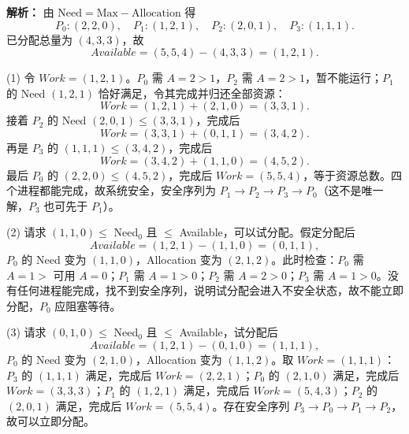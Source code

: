 \begin{enumerate}[resume]
\ifshowsolutions\par\noindent\textbf{解析：} 由 $\text{Need}=\text{Max}-\text{Allocation}$ 得
\[
P_0:(2,2,0),\quad P_1:(1,2,1),\quad P_2:(2,0,1),\quad P_3:(1,1,1).
\]
已分配总量为 $(4,3,3)$，故
\[
Available=(5,5,4)-(4,3,3)=(1,2,1).
\]

(1) 令 $Work=(1,2,1)$。$P_0$ 需 $A=2>1$，$P_2$ 需 $A=2>1$，暂不能运行；$P_1$ 的 Need $(1,2,1)$ 恰好满足，令其完成并归还全部资源：
\[
Work=(1,2,1)+(2,1,0)=(3,3,1).
\]
接着 $P_2$ 的 Need $(2,0,1)\le(3,3,1)$，完成后
\[
Work=(3,3,1)+(0,1,1)=(3,4,2).
\]
再是 $P_3$ 的 $(1,1,1)\le(3,4,2)$，完成后
\[
Work=(3,4,2)+(1,1,0)=(4,5,2).
\]
最后 $P_0$ 的 $(2,2,0)\le(4,5,2)$，完成后 $Work=(5,5,4)$，等于资源总数。四个进程都能完成，故系统安全，安全序列为 $P_1\to P_2\to P_3\to P_0$（这不是唯一解，$P_3$ 也可先于 $P_1$）。

(2) 请求 $(1,1,0)\le$ Need$_0$ 且 $\le$ Available，可以试分配。假定分配后
\[
Available=(1,2,1)-(1,1,0)=(0,1,1),
\]
$P_0$ 的 Need 变为 $(1,1,0)$，Allocation 变为 $(2,1,2)$。此时检查：$P_0$ 需 $A=1>$ 可用 $A=0$；$P_1$ 需 $A=1>0$；$P_2$ 需 $A=2>0$；$P_3$ 需 $A=1>0$。没有任何进程能完成，找不到安全序列，说明试分配会进入不安全状态，故不能立即分配，$P_0$ 应阻塞等待。

(3) 请求 $(0,1,0)\le$ Need$_0$ 且 $\le$ Available，试分配后
\[
Available=(1,2,1)-(0,1,0)=(1,1,1),
\]
$P_0$ 的 Need 变为 $(2,1,0)$，Allocation 变为 $(1,1,2)$。取 $Work=(1,1,1)$：$P_3$ 的 $(1,1,1)$ 满足，完成后 $Work=(2,2,1)$；$P_0$ 的 $(2,1,0)$ 满足，完成后 $Work=(3,3,3)$；$P_1$ 的 $(1,2,1)$ 满足，完成后 $Work=(5,4,3)$；$P_2$ 的 $(2,0,1)$ 满足，完成后 $Work=(5,5,4)$。存在安全序列 $P_3\to P_0\to P_1\to P_2$，故可以立即分配。\else \answerarea[16] \fi

\end{enumerate}

\vspace{8pt}
